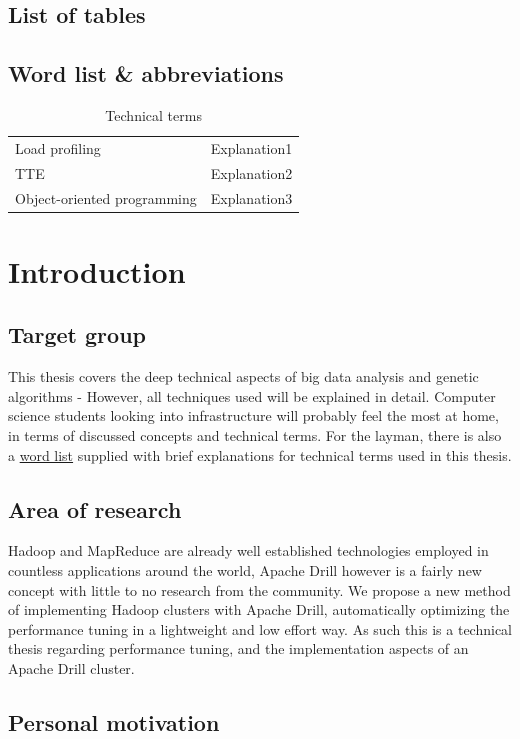 \documentclass[a4paper,english]{report}
\begin{document}
	\section{List of tables}
	\section{Word list \& abbreviations}
	\label{word_list}
	\begin{table}[h]
		\centering
		\caption{Technical terms}
		\begin{tabular}{ll}
			Load profiling	& Explanation1 \\
			TTE	& Explanation2 \\
			Object-oriented programming	& Explanation3 \\
		\end{tabular}
	\end{table}

	
	\chapter{Introduction}
		
		\section{Target group}
		This thesis covers the deep technical aspects of big data analysis and genetic algorithms - However, all techniques used will be explained in detail. Computer science students looking into infrastructure will probably feel the most at home, in terms of discussed concepts and technical terms. For the layman, there is also a \hyperref[word_list]{word list} supplied with brief explanations for technical terms used in this thesis.
		
		\section{Area of research}
		Hadoop and MapReduce are already well established technologies employed in countless applications around the world, Apache Drill however is a fairly new concept with little to no research from the community. We propose a new method of implementing Hadoop clusters with Apache Drill, automatically optimizing the performance tuning in a lightweight and low effort way. As such this is a technical thesis regarding performance tuning, and the implementation aspects of an Apache Drill cluster.
		
		\section{Personal motivation}
\end{document}
